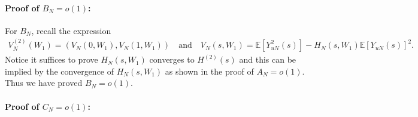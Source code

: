 \documentclass[12pt]{article}
\newcommand{\E}{\mathbb E}								%
\begin{document}
\paragraph{Proof of $B_N=o(1)$:}
	
For $B_N$, recall the expression 
\small
\begin{align*}
	V_N^{(2)}(W_1)=(V_N(0,W_1),V_N(1,W_1))\quad\text{and}\quad V_N(s,W_1)=\E[Y_{uN}^2(s)]-H_N(s,W_1)\E[Y_{uN}(s)]^2.
\end{align*}
\normalsize
Notice it suffices to prove $H_N(s,W_1)$ converges to $H^{(2)}(s)$ and this can be implied by the convergence of $H_N(s,W_1)$ as shown in the proof of $A_N=o(1)$. Thus we have proved $B_N=o(1)$.
	
\paragraph{Proof of $C_N=o(1)$:}
	
\end{document}
